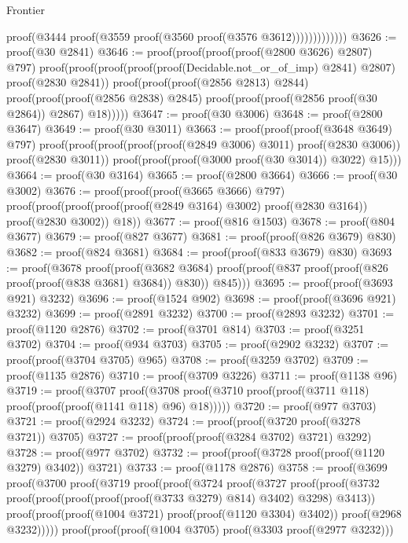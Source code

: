 \begin{lexlean}{Frontier}
\begin{coremodule}
                              proof(@3444 proof(@3559 proof(@3560 proof(@3576 @3612)))))))))))))
@3626 := proof(@30 @2841)
@3646 := proof(proof(proof(proof(@2800 @3626) @2807) @797)
      proof(proof(proof(proof(proof(Decidable.not_or_of_imp) @2841) @2807) proof(@2830 @2841))
          proof(proof(proof(@2856 @2813) @2844)
              proof(proof(proof(@2856 @2838) @2845)
                  proof(proof(proof(@2856 proof(@30 @2864)) @2867) @18)))))
@3647 := proof(@30 @3006)
@3648 := proof(@2800 @3647)
@3649 := proof(@30 @3011)
@3663 := proof(proof(proof(@3648 @3649) @797)
      proof(proof(proof(proof(proof(@2849 @3006) @3011) proof(@2830 @3006)) proof(@2830 @3011))
          proof(proof(proof(@3000 proof(@30 @3014)) @3022) @15)))
@3664 := proof(@30 @3164)
@3665 := proof(@2800 @3664)
@3666 := proof(@30 @3002)
@3676 := proof(proof(proof(@3665 @3666) @797)
      proof(proof(proof(proof(proof(@2849 @3164) @3002) proof(@2830 @3164)) proof(@2830 @3002))
          @18))
@3677 := proof(@816 @1503)
@3678 := proof(@804 @3677)
@3679 := proof(@827 @3677)
@3681 := proof(proof(@826 @3679) @830)
@3682 := proof(@824 @3681)
@3684 := proof(proof(@833 @3679) @830)
@3693 := proof(@3678
      proof(proof(@3682 @3684)
          proof(proof(@837 proof(proof(@826 proof(proof(@838 @3681) @3684)) @830)) @845)))
@3695 := proof(proof(@3693 @921) @3232)
@3696 := proof(@1524 @902)
@3698 := proof(proof(@3696 @921) @3232)
@3699 := proof(@2891 @3232)
@3700 := proof(@2893 @3232)
@3701 := proof(@1120 @2876)
@3702 := proof(@3701 @814)
@3703 := proof(@3251 @3702)
@3704 := proof(@934 @3703)
@3705 := proof(@2902 @3232)
@3707 := proof(proof(@3704 @3705) @965)
@3708 := proof(@3259 @3702)
@3709 := proof(@1135 @2876)
@3710 := proof(@3709 @3226)
@3711 := proof(@1138 @96)
@3719 := proof(@3707
      proof(@3708 proof(@3710 proof(proof(@3711 @118) proof(proof(proof(@1141 @118) @96) @18)))))
@3720 := proof(@977 @3703)
@3721 := proof(@2924 @3232)
@3724 := proof(proof(@3720 proof(@3278 @3721)) @3705)
@3727 := proof(proof(proof(@3284 @3702) @3721) @3292)
@3728 := proof(@977 @3702)
@3732 := proof(proof(@3728 proof(proof(@1120 @3279) @3402)) @3721)
@3733 := proof(@1178 @2876)
@3758 := proof(@3699
      proof(@3700
          proof(@3719
              proof(proof(@3724
                    proof(@3727
                        proof(proof(@3732
                              proof(proof(proof(proof(proof(@3733 @3279) @814) @3402) @3298) @3413))
                            proof(proof(proof(@1004 @3721) proof(proof(@1120 @3304) @3402))
                                proof(@2968 @3232)))))
                  proof(proof(proof(@1004 @3705) proof(@3303 proof(@2977 @3232)))

\end{coremodule}
\end{lexlean}
